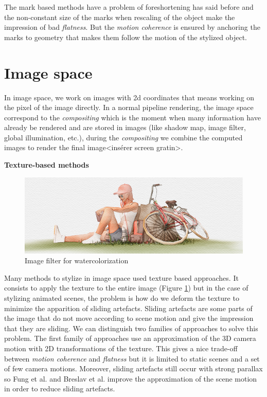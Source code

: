 The mark based methods have a problem of foreshortening has said before and the non-constant size of the marks when rescaling of the object make the impression of bad \textit{flatness}. But the \textit{motion coherence} is ensured by anchoring the marks to geometry that makes them follow the motion of the stylized object.




\section{Image space}

In image space, we work on images with 2d coordinates that means working on the pixel of the image directly. In a normal pipeline rendering, the image space correspond to the \textit{compositing} which is the moment when many information have already be rendered and are stored in images (like shadow map, image filter, global illumination, etc.), during the \textit{compositing} we combine the computed images to render the final image<insérer screen gratin>. \newline

\textbf{Texture-based methods}

\begin{figure}[H]
    \begin{center}

    \includegraphics[scale=0.5]{pics/watercolor_MNPR.png}
    \end{center}
    \caption{Image filter for watercolorization \cite{montesdeoca_mnpr:_2018}}
    \label{watercolor_MNPR}
\end{figure}

Many methods to stylize in image space used texture based approaches. It consists to apply the texture to the entire image (Figure \ref{watercolor_MNPR}) \cite{benard_state---art_2011, montesdeoca_mnpr:_2018} but in the case of stylizing animated scenes, the problem is how do we deform the texture to minimize the apparition of sliding artefacts. Sliding artefacts are some parts of the image that do not move according to scene motion and give the impression that they are sliding. We can distinguish two families of approaches to solve this problem. The first family of approaches use an approximation of the 3D camera motion with 2D transformations of the texture\cite{cunzi_dynamic_nodate}. This gives a nice trade-off between \textit{motion coherence} and \textit{flatness} but it is limited to static scenes and a set of few camera motions. Moreover, sliding artefacts still occur with strong parallax so Fung et al.\cite{fung_pen-and-ink_nodate} and Breslav et al.\cite{breslav_dynamic_nodate} improve the approximation of the scene motion in order to reduce sliding artefacts.

